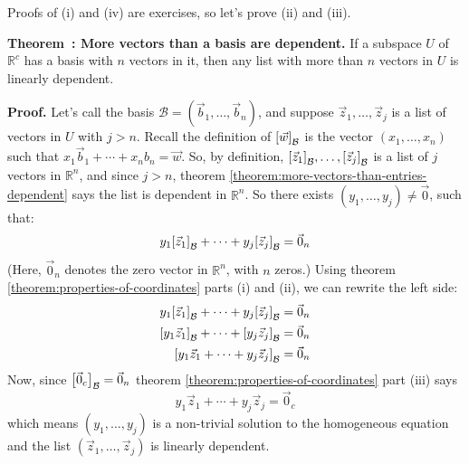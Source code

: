 \documentclass[11pt, letterpaper]{report}
\newenvironment{notes}{}{}
\newenvironment{book}{}{}
\let\originalleft\left
\let\originalright\right
\renewcommand{\left}{\mathopen{}\mathclose\bgroup\originalleft}
\renewcommand{\right}{\aftergroup\egroup\originalright}
\newcounter{exercise}[section]
\newcounter{theorem}[chapter]
\newenvironment{theorem}[1][]{\refstepcounter{theorem}\begin{bbox}\par
    \noindent\textbf{Theorem~\thetheorem: #1}}{\end{bbox}}
\newlength\oldfboxsep%
\newlength\myminiwidth%
\newenvironment{bbox}{%
  \setlength\oldfboxsep\fboxsep
  \setlength{\fboxsep}{.1in}%
  \setlength\myminiwidth\linewidth%
  \addtolength\myminiwidth{-0.2in}%
  \vspace{0.1in}%
  \begin{lrbox}{\bboxbox}\begin{minipage}{\myminiwidth}%
    }{%
    \end{minipage}\end{lrbox}%
  \noindent\fbox{\usebox{\bboxbox}}\vspace{0.1in}\setlength\fboxsep\oldfboxsep%
}
\newcommand{\R}{\mathbb{R}}
\begin{document}
\begin{notes}
Proofs of (i) and (iv) are exercises, so let's prove (ii) and (iii).

\vfill 
\vfill 
\vfill 
\vfill 
\newpage
\end{notes}

\begin{theorem}[More vectors than a basis are dependent.]
\label{theorem:more-vectors-than-a-basis}
If a subspace $U$ of $\R^c$ has a basis with $n$ vectors in it, then any list with more than $n$ vectors in $U$ is linearly dependent.
\end{theorem}

\begin{notes}
\vfill \vfill
\end{notes}

\begin{book}
\textbf{Proof.} Let's call the basis $\mathcal{B}=(  \vec{b}_1, \ldots ,\vec{b}_n)$, and suppose $\vec{z}_1, \ldots, \vec{z}_j$ is a list of vectors in $U$ with $j>n$. Recall the definition of $\left[ \vec{w} \right]_{\mathcal{B}}$ is the vector $(x_1,\ldots,x_n)$ such that $x_1\vec{b}_1+\cdots+x_nb_n = \vec{w}$. So, by definition, $\left[ \vec{z}_1 \right]_{\mathcal{B}},\ldots,\left[ \vec{z}_j \right]_{\mathcal{B}}$ is a list of $j$ vectors in $\R^n$, and since $j>n$, theorem \ref{theorem:more-vectors-than-entries-dependent} says the list is dependent in $\R^n$. So there exists $(y_1,\ldots,y_j)\ne \vec{0}$, such that:
\[y_1 \left[ \vec{z}_1 \right]_{\mathcal{B}} + \cdots + y_j \left[ \vec{z}_j \right]_{\mathcal{B}} = \vec{0}_n \]
(Here, $\vec{0}_n$ denotes the zero vector in $\R^n$, with $n$ zeros.) Using theorem \ref{theorem:properties-of-coordinates} parts (i) and (ii), we can rewrite the left side:
\begin{align*}
y_1 \left[ \vec{z}_1 \right]_{\mathcal{B}} + \cdots + y_j \left[ \vec{z}_j \right]_{\mathcal{B}} &= \vec{0}_n \\
\left[ y_1\vec{z}_1 \right]_{\mathcal{B}} + \cdots + \left[ y_j\vec{z}_j \right]_{\mathcal{B}} &= \vec{0}_n \\
\left[ y_1\vec{z}_1  + \cdots +  y_j\vec{z}_j \right]_{\mathcal{B}} &= \vec{0}_n 
\end{align*}
Now, since $\left[ \vec{0}_c \right]_{\mathcal{B}} = \vec{0}_n$ theorem \ref{theorem:properties-of-coordinates} part (iii) says
\[y_1\vec{z}_1  + \cdots +  y_j\vec{z}_j = \vec{0}_c\]
which means $(y_1,\ldots,y_j)$ is a non-trivial solution to the homogeneous equation and the list $( \vec{z}_1,\ldots,\vec{z}_j )$ is linearly dependent. \blacksquare
\end{book}
\end{document}
